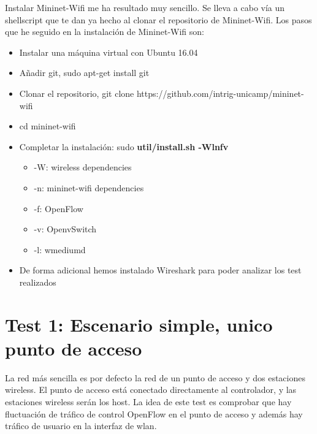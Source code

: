 Instalar Mininet-Wifi me ha resultado muy sencillo. Se lleva a cabo vía un shellscript que te dan ya hecho al clonar el repositorio de Mininet-Wifi. Los pasos que he seguido en la instalación de Mininet-Wifi son:
\begin{itemize}
    \item Instalar una máquina virtual con Ubuntu 16.04
    \item Añadir git, sudo apt-get install git 
    \item Clonar el repositorio, git clone https://github.com/intrig-unicamp/mininet-wifi
    \item cd mininet-wifi
    \item Completar la instalación: sudo \textbf{util/install.sh -Wlnfv}
    \begin{itemize}
        \item -W: wireless dependencies
        \item -n: mininet-wifi dependencies
        \item -f: OpenFlow
        \item -v: OpenvSwitch
        \item -l: wmediumd
    \end{itemize}
    \item De forma adicional hemos instalado Wireshark para poder analizar los test realizados
\end{itemize}

\section{Test 1: Escenario simple, unico punto de acceso}
La red más sencilla es por defecto la red de un punto de acceso y dos estaciones wireless. El punto de acceso está conectado directamente al controlador, y las estaciones wireless serán los host. La idea de este test es comprobar que hay fluctuación de tráfico de control OpenFlow en el punto de acceso y además hay tráfico de usuario en la interfaz de wlan.
